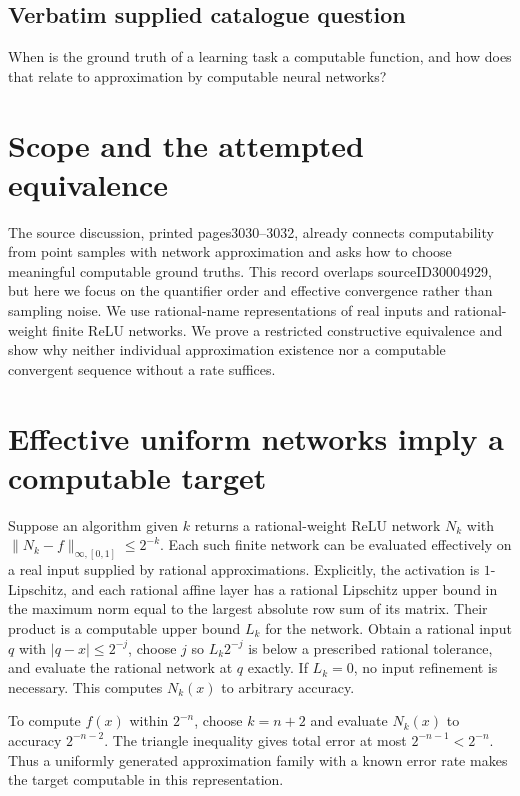 \documentclass[11pt]{article}
\begin{document}
\subsection{Verbatim supplied catalogue question}
When is the ground truth of a learning task a computable function, and how does that relate to approximation by computable neural networks?

\section{Scope and the attempted equivalence}
The source discussion, printed pages3030--3032, already connects
computability from point samples with network approximation and
asks how to choose meaningful computable ground truths. This
record overlaps sourceID30004929, but here we focus on the
quantifier order and effective convergence rather than sampling
noise. We use rational-name representations of real inputs and
rational-weight finite ReLU networks. We prove a restricted
constructive equivalence and show why neither individual
approximation existence nor a computable convergent sequence
without a rate suffices.

\section{Effective uniform networks imply a computable target}
Suppose an algorithm given $k$ returns a rational-weight ReLU
network $N_k$ with
$\|N_k-f\|_{\infty,[0,1]}\le2^{-k}$.
Each such finite network can be evaluated effectively on a real
input supplied by rational approximations. Explicitly, the
activation is $1$-Lipschitz, and each rational affine layer has
a rational Lipschitz upper bound in the maximum norm equal
to the largest absolute row sum of its matrix. Their product
is a computable upper bound $L_k$ for the network. Obtain a
rational input $q$ with $|q-x|\le2^{-j}$, choose $j$ so
$L_k2^{-j}$ is below a prescribed rational tolerance, and
evaluate the rational network at $q$ exactly. If $L_k=0$,
no input refinement is necessary. This computes $N_k(x)$
to arbitrary accuracy.

To compute $f(x)$ within $2^{-n}$, choose $k=n+2$ and
evaluate $N_k(x)$ to accuracy $2^{-n-2}$. The triangle
inequality gives total error at most $2^{-n-1}<2^{-n}$.
Thus a uniformly generated approximation family with a known
error rate makes the target computable in this representation.
\end{document}
